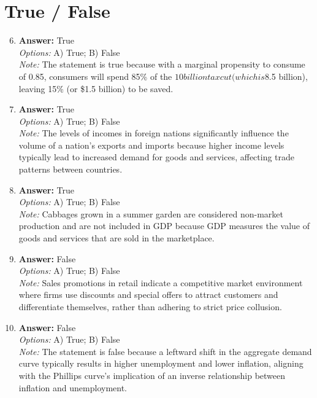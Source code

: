 \documentclass[12pt]{article}
\begin{document}
\section*{True / False}
\begin{enumerate}[label=\arabic*.]
\setcounter{enumi}{5}
\item \textbf{Answer:} True
\\ \textit{Options:} A) True; B) False
\\ \textit{Note:} The statement is true because with a marginal propensity to consume of 0.85, consumers will spend 85\% of the $10 billion tax cut (which is $8.5 billion), leaving 15\% (or \$1.5 billion) to be saved.
\item \textbf{Answer:} True
\\ \textit{Options:} A) True; B) False
\\ \textit{Note:} The levels of incomes in foreign nations significantly influence the volume of a nation's exports and imports because higher income levels typically lead to increased demand for goods and services, affecting trade patterns between countries.
\item \textbf{Answer:} True
\\ \textit{Options:} A) True; B) False
\\ \textit{Note:} Cabbages grown in a summer garden are considered non-market production and are not included in GDP because GDP measures the value of goods and services that are sold in the marketplace.
\item \textbf{Answer:} False
\\ \textit{Options:} A) True; B) False
\\ \textit{Note:} Sales promotions in retail indicate a competitive market environment where firms use discounts and special offers to attract customers and differentiate themselves, rather than adhering to strict price collusion.
\item \textbf{Answer:} False
\\ \textit{Options:} A) True; B) False
\\ \textit{Note:} The statement is false because a leftward shift in the aggregate demand curve typically results in higher unemployment and lower inflation, aligning with the Phillips curve's implication of an inverse relationship between inflation and unemployment.
\end{enumerate}
\end{document}
